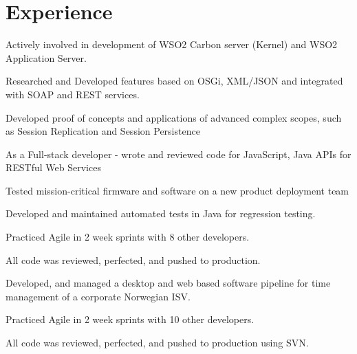 \documentclass[]{pubudu-resume-openfont}
\begin{document}
\begin{minipage}[t]{0.33\textwidth}
%
%

\end{minipage} 
\hfill
\begin{minipage}[t]{0.66\textwidth} 


\section{Experience}

\vspace{\topsep} %
\begin{tightemize}\item Actively involved in development of WSO2 Carbon server (Kernel) and WSO2 Application Server.\item Researched and Developed features based on OSGi, XML/JSON and integrated with SOAP and REST services. \item Developed proof of concepts and applications of advanced complex scopes, such as Session Replication and Session
Persistence \item As a Full-stack developer - wrote and reviewed code for JavaScript, Java APIs for RESTful Web Services  \item Tested mission-critical firmware and software on a new product deployment team \item Developed and maintained automated tests in Java for regression testing. \item Practiced Agile in 2 week sprints with 8 other developers. \item All code was reviewed, perfected, and pushed to production.
\end{tightemize}
\sectionsep

\begin{tightemize}
\item Developed, and managed a desktop and web based software pipeline for time management of a corporate Norwegian ISV. \item Practiced Agile in 2 week sprints with 10 other developers.\item All code was reviewed, perfected, and pushed to production using SVN.\end{tightemize}
\sectionsep



\end{minipage}
\end{document}

